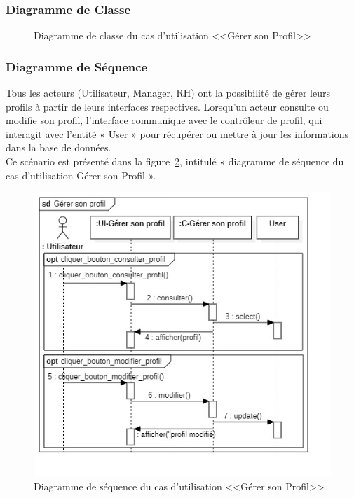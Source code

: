 \subsubsection{Diagramme de Classe}
\begin{figure}[h]
     \centering
     \caption{Diagramme de classe du cas d'utilisation <<Gérer son Profil>>}
     \label{fig:class_manage_profile}
\end{figure}

\subsubsection{Diagramme de Séquence}
Tous les acteurs (Utilisateur, Manager, RH) ont la possibilité de gérer leurs profils à partir de leurs interfaces respectives. Lorsqu’un acteur consulte ou modifie son profil, l’interface communique avec le contrôleur de profil, qui interagit avec l’entité « User » pour récupérer ou mettre à jour les informations dans la base de données.\\
Ce scénario est présenté dans la figure~\ref{fig:seq_manage_profile}, intitulé « diagramme de séquence du cas d’utilisation Gérer son Profil ».
\begin{figure}[h]
     \centering
     \includegraphics[width=13cm]{images/S_Gerer son profil.jpg}
     \caption{Diagramme de séquence du cas d'utilisation <<Gérer son Profil>>}
     \label{fig:seq_manage_profile}
\end{figure}
\newpage
